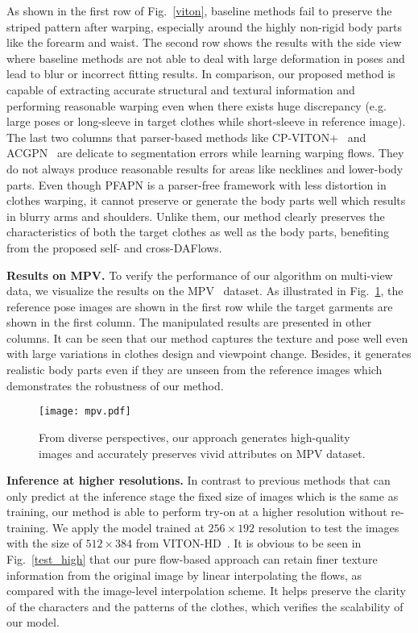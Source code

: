 \documentclass[runningheads]{llncs}
\begin{document}
As shown in the first row of Fig.~\ref{viton}, baseline methods fail to preserve the striped pattern after warping, especially around the highly non-rigid body parts like the forearm and waist. The second row shows the results with the side view where baseline methods are not able to deal with large deformation in poses and lead to blur or incorrect fitting results. In comparison, our proposed method is capable of extracting accurate structural and textural information and performing reasonable warping even when there exists huge discrepancy (e.g. large poses or long-sleeve in target clothes while short-sleeve in reference image). The last two columns that parser-based methods like CP-VITON+~\cite{cpvtonplus} and ACGPN~\cite{AGCPN} are delicate to segmentation errors while learning warping flows. They do not always produce reasonable results for areas like necklines and lower-body parts. Even though PFAPN is a parser-free framework with less distortion in clothes warping, it cannot preserve or generate the body parts well which results in blurry arms and shoulders. Unlike them, our method clearly preserves the characteristics of both the target clothes as well as the body parts, benefiting from the proposed self- and cross-DAFlows.





\textbf{Results on MPV.}
To verify the performance of our algorithm on multi-view data, we visualize the results on the MPV~\cite{MPV} dataset. As illustrated in Fig.~\ref{mpvvis}, the reference pose images are shown in the first row while the target garments are shown in the first column. The manipulated results are presented in other columns. It can be seen that our method captures the texture and pose well even with large variations in clothes design and viewpoint change. Besides, it generates realistic body parts even if they are unseen from the reference images which demonstrates the robustness of our method.
\begin{figure}[t]
\centering
\texttt{[image: mpv.pdf]}
   \caption{From diverse perspectives, our approach generates high-quality images and accurately preserves vivid attributes on MPV dataset.}\label{mpvvis}
\end{figure}

\textbf{Inference at higher resolutions.}
In contrast to previous methods that can only predict at the inference stage the fixed size of images which is the same as training, our method is able to perform try-on at a higher resolution without re-training. We apply the model trained at $256 \times 192$ resolution to test the images with the size of $512 \times 384$ from VITON-HD~\cite{han2018viton}. It is obvious to be seen in Fig.~\ref{test_high} that our pure flow-based approach can retain finer texture information from the original image by linear interpolating the flows, as compared with the image-level interpolation scheme. It helps preserve the clarity of the characters and the patterns of the clothes, which verifies the scalability of our model.
\end{document}
